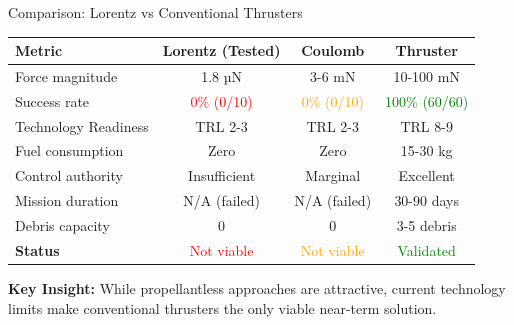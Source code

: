 \documentclass[aspectratio=169]{beamer}
\begin{document}
\begin{frame}{Comparison: Lorentz vs Conventional Thrusters}
\begin{center}
\begin{tabular}{lccc}
\toprule
\textbf{Metric} & \textbf{Lorentz (Tested)} & \textbf{Coulomb} & \textbf{Thruster} \\
\midrule
Force magnitude & 1.8 µN & 3-6 mN & 10-100 mN \\
Success rate & \textcolor{red}{0\% (0/10)} & \textcolor{orange}{0\% (0/10)} & \textcolor{green}{100\% (60/60)} \\
Technology Readiness & TRL 2-3 & TRL 2-3 & TRL 8-9 \\
Fuel consumption & Zero & Zero & 15-30 kg \\
Control authority & Insufficient & Marginal & Excellent \\
Mission duration & N/A (failed) & N/A (failed) & 30-90 days \\
Debris capacity & 0 & 0 & 3-5 debris \\
\midrule
\textbf{Status} & \textcolor{red}{Not viable} & \textcolor{orange}{Not viable} & \textcolor{green}{Validated} \\
\bottomrule
\end{tabular}
\end{center}

\vspace{0.5cm}
\textbf{Key Insight:} While propellantless approaches are attractive, current technology limits make conventional thrusters the only viable near-term solution.
\end{frame}
\end{document}
